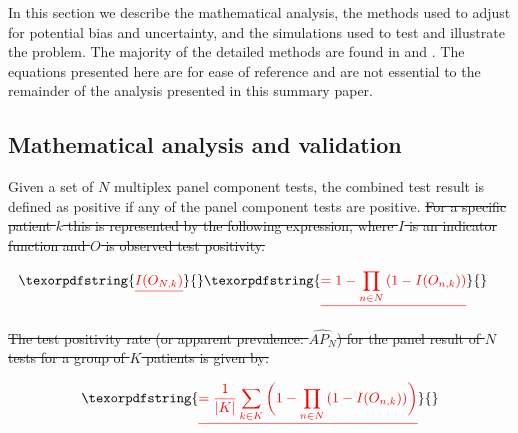 \documentclass[10pt,letterpaper]{article}
\providecommand{\DIFdeltex}[1]{{\protect\color{red}\sout{#1}}}                      %
\providecommand{\DIFdelbegin}{} %
\providecommand{\DIFdel}[1]{\texorpdfstring{\DIFdeltex{#1}}{}} %
\newcommand{\DIFscaledelfig}{0.5}
\newlength{\DIFdelgraphicswidth} %
\newlength{\DIFdelgraphicsheight} %
\newcommand{\DIFdelincludegraphics}[2][]{%
\sbox{\DIFdelgraphicsbox}{\DIFOincludegraphics[#1]{#2}}%
\settoboxwidth{\DIFdelgraphicswidth}{\DIFdelgraphicsbox} %
\settoboxtotalheight{\DIFdelgraphicsheight}{\DIFdelgraphicsbox} %
\scalebox{\DIFscaledelfig}{%
\parbox[b]{\DIFdelgraphicswidth}{\usebox{\DIFdelgraphicsbox}\\[-\baselineskip] \rule{\DIFdelgraphicswidth}{0em}}\llap{\resizebox{\DIFdelgraphicswidth}{\DIFdelgraphicsheight}{%
\setlength{\unitlength}{\DIFdelgraphicswidth}%
\begin{picture}(1,1)%
\thicklines\linethickness{2pt} %
{\color[rgb]{1,0,0}\put(0,0){\framebox(1,1){}}}%
{\color[rgb]{1,0,0}\put(0,0){\line( 1,1){1}}}%
{\color[rgb]{1,0,0}\put(0,1){\line(1,-1){1}}}%
\end{picture}%
}\hspace*{3pt}}} %
} %
\DeclareRobustCommand{\DIFdelbegin}{\DIFOdelbegin \let\includegraphics\DIFdelincludegraphics} %
\begin{document}
In this section we describe the mathematical analysis, the methods used to adjust for potential bias and uncertainty, and the simulations used to test and illustrate the problem. The majority of the detailed methods are found in  and . The equations presented here are for ease of reference and are not essential to the remainder of the analysis presented in this summary paper.

\subsection*{Mathematical analysis and validation}

Given a set of \(N\) multiplex panel component tests, the combined test result is defined as positive if any of the panel component tests are positive. \DIFdelbegin \DIFdel{For a specific patient \(k\) this is represented by the following expression, where \(I\) is an indicator function and \(O\) is observed test positivity.
}%

\begin{align*}%
\DIFdel{I(O_{N,k}) }%
&%
\DIFdel{= 1-\prod_{n \in N}{(1-I(O_{n,k}))}
}%
\end{align*}%

\DIFdel{The test positivity rate (or apparent prevalence: \(\widehat{AP_N}\)) for the panel result of \(N\) tests for a group of \(K\) patients is given by:
}%

\begin{align*}%
\DIFdel{= \frac{1}{|K|}\sum_{k \in K}{\bigg(1-\prod_{n \in N}{(1-I(O_{n,k}))}\bigg)}
}%
\end{align*}%
\end{document}
